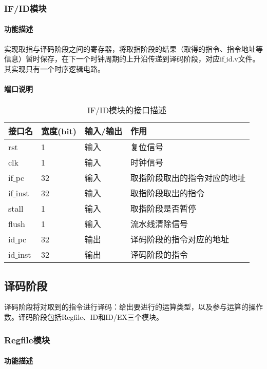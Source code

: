 \subsubsection{IF/ID模块}
\paragraph{功能描述}
\quad

\quad

实现取指与译码阶段之间的寄存器，将取指阶段的结果（取得的指令、指令地址等信息）暂时保存，在下一个时钟周期的上升沿传递到译码阶段，对应if$\_$id.v文件。其实现只有一个时序逻辑电路。
\paragraph{端口说明}
\quad

\quad
\begin{table}[H]
	\centering
	\caption{IF/ID模块的接口描述}
	\begin{tabular}{|l|l|l|l|}
		\hline
		接口名 & 宽度(bit) & 输入/输出 & 作用 \\
		\hline
		rst & 1 & 输入 & 复位信号 \\
		\hline
		clk & 1 & 输入 & 时钟信号 \\
		\hline
		if$\_$pc & 32 & 输入 & 取指阶段取出的指令对应的地址 \\
		\hline
		if$\_$inst & 32 & 输入 & 取指阶段取出的指令 \\
		\hline
		stall & 1 & 输入 & 取指阶段是否暂停 \\
		\hline
		flush & 1 & 输入 & 流水线清除信号 \\
		\hline
		id$\_$pc & 32 & 输出 & 译码阶段的指令对应的地址 \\
		\hline
		id$\_$inst & 32 & 输出 & 译码阶段的指令 \\
		\hline
	\end{tabular}
\end{table}
\subsection{译码阶段}
译码阶段将对取到的指令进行译码：给出要进行的运算类型，以及参与运算的操作数。译码阶段包括Regfile、ID和ID/EX三个模块。
\subsubsection{Regfile模块}
\paragraph{功能描述}
\quad

